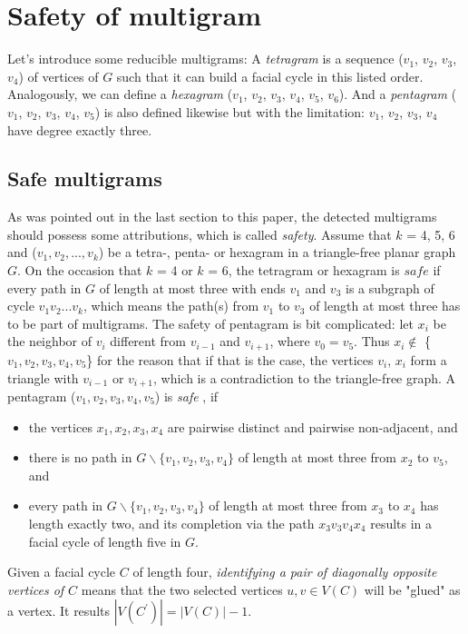 \section{Safety of multigram}
Let's introduce some reducible multigrams: A \textit{tetragram} is a sequence ($v_1$, $v_2$, $v_3$, $v_4$) of vertices of $G$ such that it can build a facial cycle in this listed order. Analogously, we can define a \textit{hexagram} ($v_1$, $v_2$, $v_3$, $v_4$, $v_5$, $v_6$). And a \textit{pentagram} ($v_1$, $v_2$, $v_3$, $v_4$, $v_5$) is also defined likewise but with the limitation: $v_1$, $v_2$, $v_3$, $v_4$ have degree exactly three.

\subsection{Safe multigrams}
As was pointed out in the last section to this paper, the detected multigrams should possess some attributions, which is called \textit{safety}. Assume that $k$ = 4, 5, 6 and ($v_1, v_2, ..., v_k$) be a tetra-, penta- or hexagram in a triangle-free planar graph $G$. On the occasion that $k$ = 4 or $k$ = 6, the tetragram or hexagram is $safe$ if every path in $G$ of length at most three with ends $v_1$ and $v_3$ is a subgraph of cycle $v_1v_2...v_k$, which means the path(s) from $v_1$ to $v_3$ of length at most three has to be part of multigrams. The safety of pentagram is bit complicated: let $x_i$ be the neighbor of $v_i$ different from $v_{i-1}$ and $v_{i+1}$, where $v_0 = v_5$. Thus $x_i \notin$ \{$v_1, v_2, v_3, v_4, v_5$\} for the reason that if that is the case, the vertices $v_i$, $x_i$ form a triangle with $v_{i-1}$ or $v_{i+1}$, which is a contradiction to the triangle-free graph. A pentagram ($v_1, v_2, v_3, v_4, v_5$) is \textit{safe} \cite{dvorak2013threecoloring}, if
\begin{itemize}
    \item the vertices $x_1, x_2, x_3, x_4$ are pairwise distinct and pairwise non-adjacent, and
    \item there is no path in $G \backslash \{v_1, v_2, v_3, v_4\}$ of length at most three from $x_2$ to $v_5$, and
    \item every path in $G \backslash \{v_1, v_2, v_3, v_4\}$ of length at most three from $x_3$ to $x_4$ has length exactly two, and its completion via the path $x_3v_3v_4x_4$ results in a facial cycle of length five in $G$.
\end{itemize}

\begin{definition}
Given a facial cycle $C$ of length four, \textit{identifying a pair of
diagonally opposite vertices of $C$} means that the two selected vertices $u, v \in V(C)$ will be "glued" as a vertex. It results $|V(C^{'})| = |V(C)| - 1$.
\end{definition}

